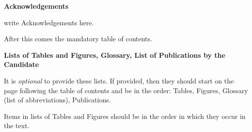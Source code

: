 \noindent
{\LARGE\textbf{Acknowledgements}}
\vspace{1cm}

\begin{spacing}{1} 
\noindent
write Acknowledgements here. 

After this comes the mandatory table of contents. 

\textbf{Lists of Tables and Figures, Glossary, List of Publications by the Candidate}

It is \textit{optional} to provide these lists. If provided, then they should start on the page following the table of contents and be in the order: Tables, Figures, Glossary (list of abbreviations), Publications.  

Items in lists of Tables and Figures should be in the order in which they occur in the text.
\end{spacing}
